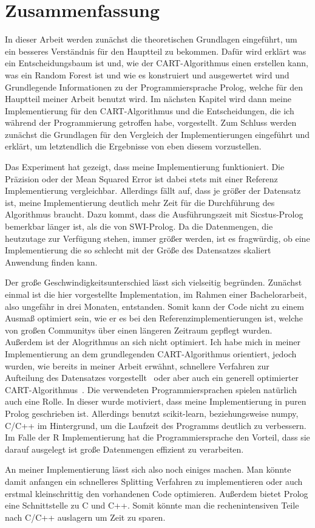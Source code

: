 \section{Zusammenfassung}

In dieser Arbeit werden zunächst die theoretischen Grundlagen eingeführt, um ein besseres Verständnis für den
Hauptteil zu bekommen. Dafür wird erklärt was ein Entscheidungsbaum ist und, wie der CART-Algorithmus einen erstellen kann,
was ein Random Forest ist und wie es konstruiert und ausgewertet wird und Grundlegende Informationen zu der
Programmiersprache Prolog, welche für den Hauptteil meiner Arbeit benutzt wird.
Im nächsten Kapitel wird dann meine Implementierung für den CART-Algorithmus und die Entscheidungen, die 
ich während der Programmierung getroffen habe, vorgestellt.
Zum Schluss werden zunächst die Grundlagen für den Vergleich der Implementierungen eingeführt und erklärt, um
letztendlich die Ergebnisse von eben diesem vorzustellen.

Das Experiment hat gezeigt, dass meine Implementierung funktioniert.
Die Präzision oder der Mean Squared Error ist dabei stets mit einer Referenz Implementierung
vergleichbar. Allerdings fällt auf, dass je größer der Datensatz ist, meine Implementierung
deutlich mehr Zeit für die Durchführung des Algorithmus braucht.
Dazu kommt, dass die Ausführungszeit mit Sicstus-Prolog bemerkbar länger ist, als die von SWI-Prolog.
Da die Datenmengen, die heutzutage zur Verfügung stehen, immer größer werden, ist es fragwürdig,
ob eine Implementierung die so schlecht mit der Größe des Datensatzes skaliert Anwendung finden kann.

Der große Geschwindigkeitsunterschied lässt sich vielseitig begründen. Zunächst einmal ist die hier vorgestellte Implementation,
im Rahmen einer Bachelorarbeit, also ungefähr in drei Monaten, entstanden. Somit kann der Code nicht zu einem Ausmaß optimiert sein,
wie er es bei den Referenzimplementierungen ist, welche von großen Communitys über einen längeren Zeitraum gepflegt wurden.
Außerdem ist der Alogrithmus an sich nicht optimiert. Ich habe mich in meiner Implementierung an dem grundlegenden CART-Algorithmus
orientiert, jedoch wurden, wie bereits in meiner Arbeit erwähnt, schnellere Verfahren zur Aufteilung des Datensatzes vorgestellt~\cite{MOLA1997}
oder aber auch ein generell optimierter CART-Algorithmus~\cite{CRAWFORD1989197}.
Die verwendeten Programmiersprachen spielen natürlich auch eine Rolle. In dieser wurde motiviert, dass meine Implementierung in puren 
Prolog geschrieben ist. Allerdings benutzt scikit-learn, beziehungsweise numpy, C/C++ im Hintergrund, um die Laufzeit
des Programms deutlich zu verbessern. Im Falle der R Implementierung hat die Programmiersprache den Vorteil, dass sie darauf
ausgelegt ist große Datenmengen effizient zu verarbeiten.

An meiner Implementierung lässt sich also noch einiges machen. Man könnte damit anfangen ein schnelleres Splitting Verfahren zu implementieren
oder auch erstmal kleinschrittig den vorhandenen Code optimieren. Außerdem bietet Prolog eine Schnittstelle zu C und C++. Somit
könnte man die rechenintensiven Teile nach C/C++ auslagern um Zeit zu sparen.